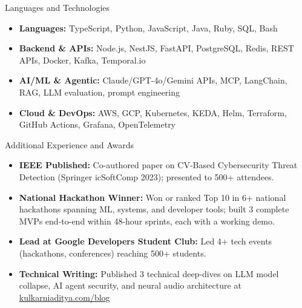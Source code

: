 \documentclass[]{mcdowellcv}
\begin{document}
\begin{cvsection}{Languages and Technologies}
  \begin{cvsubsection}{}{}{}
    \begin{itemize}
      \item \textbf{Languages:} TypeScript, Python, JavaScript, Java, Ruby, SQL, Bash
      \item \textbf{Backend \& APIs:} Node.js, NestJS, FastAPI, PostgreSQL, Redis, REST APIs, Docker, Kafka, Temporal.io
      \item \textbf{AI/ML \& Agentic:} Claude/GPT-4o/Gemini APIs, MCP, LangChain, RAG, LLM evaluation, prompt engineering
      \item \textbf{Cloud \& DevOps:} AWS, GCP, Kubernetes, KEDA, Helm, Terraform, GitHub Actions, Grafana, OpenTelemetry
    \end{itemize}
  \end{cvsubsection}
\end{cvsection}

\begin{cvsection}{Additional Experience and Awards}
  \begin{cvsubsection}{}{}{}
    \begin{itemize}
      \item \textbf{IEEE Published:} Co-authored paper on CV-Based Cybersecurity Threat Detection (Springer icSoftComp 2023); presented to 500+ attendees.
      \item \textbf{National Hackathon Winner:} Won or ranked Top 10 in 6+ national hackathons spanning ML, systems, and developer tools; built 3 complete MVPs end-to-end within 48-hour sprints, each with a working demo.
      \item \textbf{Lead at Google Developers Student Club:} Led 4+ tech events (hackathons, conferences) reaching 500+ students.
      \item \textbf{Technical Writing:} Published 3 technical deep-dives on LLM model collapse, AI agent security, and neural audio architecture at \href{https://www.kulkarniaditya.com/blog}{kulkarniaditya.com/blog}
    \end{itemize}
  \end{cvsubsection}
\end{cvsection}
\end{document}
